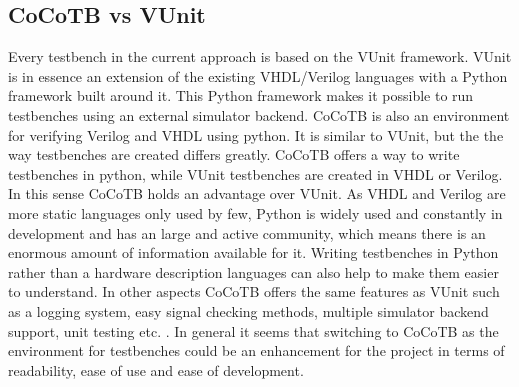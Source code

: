 \subsection{CoCoTB vs VUnit}
Every testbench in the current approach is based on the VUnit framework. VUnit is in essence an extension of the existing VHDL/Verilog languages with a Python framework built around it. This Python framework makes it possible to run testbenches using an external simulator backend.
\npar
CoCoTB \cite{cocotb} is also an environment for verifying Verilog and VHDL using python. It is similar to VUnit, but the the way testbenches are created differs greatly. CoCoTB offers a way to write testbenches in python, while VUnit testbenches are created in VHDL or Verilog.
\npar
In this sense CoCoTB holds an advantage over VUnit. As VHDL and Verilog are more static languages only used by few, Python is widely used and constantly in development and has an large and active community, which means there is an enormous amount of information available for it. Writing testbenches in Python rather than a hardware description languages can also help to make them easier to understand. In other aspects CoCoTB offers the same features as VUnit such as a logging system, easy signal checking methods, multiple simulator backend support, unit testing etc. .
\npar
In general it seems that switching to CoCoTB as the environment for testbenches could be an enhancement for the project in terms of readability, ease of use and ease of development.